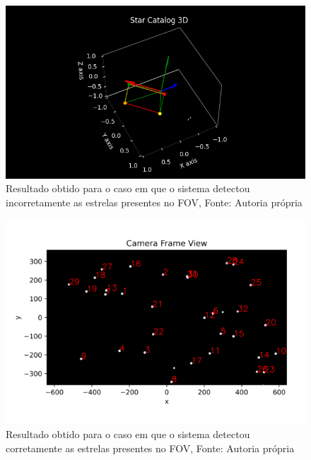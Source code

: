 \begin{figure}[H]
    \centering
    \includegraphics[width=1\textwidth]{images/errou_3D.png}
    \caption{Resultado obtido para o caso em que o sistema detectou incorretamente as estrelas presentes no FOV, Fonte: Autoria própria}
    \label{fig:errou_3D}
\end{figure}

\begin{figure}[H]
    \centering
    \includegraphics[width=1\textwidth]{images/acertou.png}
    \caption{Resultado obtido para o caso em que o sistema detectou corretamente as estrelas presentes no FOV, Fonte: Autoria própria}
    \label{fig:acertou}
\end{figure}

